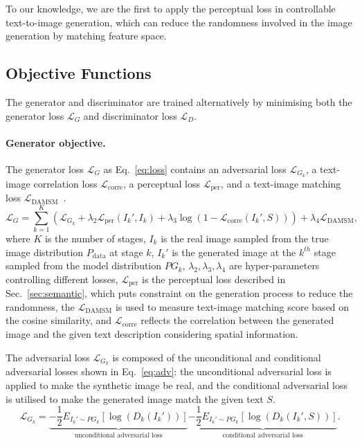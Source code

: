 \documentclass{article}
\begin{document}
To our knowledge, we are the first to apply the perceptual loss \cite{johnson2016perceptual} in controllable text-to-image generation, {which can} reduce the randomness involved in the image generation by matching feature space. 


\subsection{Objective Functions}
\label{obj}
The generator and discriminator are trained alternatively by minimising both the generator loss $\mathcal{L}_G$ and discriminator loss $\mathcal{L}_D$.

\paragraph{Generator objective.} 
The generator loss $\mathcal{L}_G$ as Eq.~\eqref{eq:loss} contains an adversarial loss $\mathcal{L}_{G_k}$, a text-image correlation loss $\mathcal{L}_{\text{corre}}$, a perceptual loss $\mathcal{L}_\text{per}$, and a text-image matching loss $\mathcal{L}_\text{DAMSM}$~\cite{xu2018attngan}.  
\begin{equation}
\mathcal{L}_{G}=\sum _{k=1}^{K}(\mathcal{L}_{G_k}+ \lambda_{2}\mathcal{L}_\text{per}({I_{k}}', I_{k}) +  \lambda_3\log(1-\mathcal{L}_\text{corre}(I_k',S))) + \lambda_4\mathcal{L}_\text{DAMSM} 
\textrm{,}
\label{eq:loss}
\end{equation}
where $K$ is the number of stages, $I_{k}$ is the real image sampled from the true image distribution $P_\text{data}$ at stage $k$, ${I_{k}}'$ is the generated image at the $k^{th}$ stage sampled from the model distribution $PG_{k}$, $\lambda_{2}, \lambda_{3}, \lambda_{4}$ are hyper-parameters controlling different losses, $\mathcal{L}_\text{per}$ is the perceptual loss described in Sec.~\ref{sec:semantic}, which puts constraint on the generation process to reduce the randomness, the $\mathcal{L}_\text{DAMSM}$ \cite{xu2018attngan} is used to measure text-image matching score based on the cosine similarity, and $\mathcal{L}_\text{corre}$ reflects the correlation between the generated image and the given text description considering spatial information.

The adversarial loss $\mathcal{L}_{G_k}$ is composed of the unconditional and conditional adversarial losses shown in Eq.~\eqref{eq:adv}: the unconditional adversarial loss is applied to make the synthetic image be real, and the conditional adversarial loss is utilised to make the generated image match the given text $S$.
\begin{equation}
\mathcal{L}_{G_{k}}=\underbrace{-\frac{1}{2}E_{{I_{k}}'\sim PG_{k}}\left [ \log(D_{k}({I_{k}}')) \right ]}_\text{unconditional adversarial loss}\underbrace{-\frac{1}{2}E_{{I_{k}}'\sim PG_{k}}\left [ \log(D_{k}({I_{k}}',S)) \right ]}_\text{conditional adversarial loss}
\textrm{.}
\label{eq:adv}
\end{equation}
\end{document}
